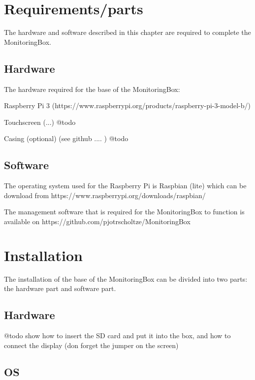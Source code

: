 \documentclass[11pt]{report}
\begin{document}
\chapter{Requirements/parts}
	The hardware and software described in this chapter are required to complete the MonitoringBox.
	\section{Hardware}
		The hardware required for the base of the MonitoringBox:
		\begin{list}{-}
			\item Raspberry Pi 3 (https://www.raspberrypi.org/products/raspberry-pi-3-model-b/)
			\item 
			\item Touchscreen (...) @todo
			\item Casing (optional) (see github .... ) @todo
		\end{list}
	\section{Software}
		The operating system used for the Raspberry Pi is Raspbian (lite) which can be download from https://www.raspberrypi.org/downloads/raspbian/
		
		The management software that is required for the MonitoringBox to function is available on https://github.com/pjotrscholtze/MonitoringBox

\chapter{Installation}
	The installation of the base of the MonitoringBox can be divided into two parts: the hardware part and software part. 
	\section{Hardware}
		@todo show how to insert the SD card and put it into the box, and how to connect the display (don forget the jumper on the screen)
	\newpage
	\section{OS}
\end{document}
